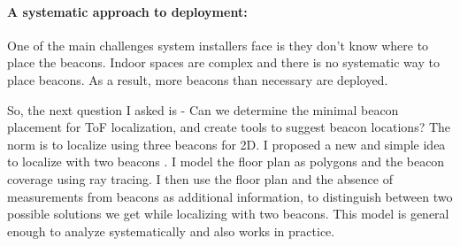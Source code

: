 \documentclass[10pt]{article}
\begin{document}


\paragraph{A systematic approach to deployment: }
One of the main challenges system installers face is they don't know
where to place the beacons. Indoor spaces are complex and there is no
systematic way to place beacons.  As a result, more beacons than
necessary are deployed.


So, the next question I asked is - Can we determine the minimal beacon
placement for ToF localization, and create tools to suggest beacon
locations? The norm is to localize using three beacons for 2D.  I
proposed a new and simple idea to localize with two beacons
\cite{rajagopal2016beacon}. I model the floor plan as polygons and the
beacon coverage using ray tracing. I then use the floor plan and the
absence of measurements from beacons as additional information, to
distinguish between two possible solutions we get while localizing
with two beacons. This model is general enough to analyze
systematically and also works in practice.

\end{document}
